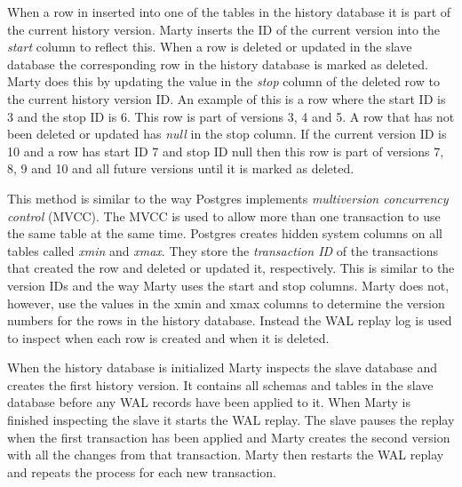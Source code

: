 When a row in inserted into one of the tables in the history database it is part of the current history version.
Marty inserts the ID of the current version into the \textit{start} column to reflect this.
When a row is deleted or updated in the slave database the corresponding row in the history database is marked as deleted.
Marty does this by updating the value in the \textit{stop} column of the deleted row to the current history version ID.
An example of this is a row where the start ID is 3 and the stop ID is 6.
This row is part of versions 3, 4 and 5.
A row that has not been deleted or updated has \textit{null} in the stop column.
If the current version ID is 10 and a row has start ID 7 and stop ID null then this row is part of versions 7, 8, 9 and 10 and all future versions until it is marked as deleted.

This method is similar to the way Postgres implements \textit{multiversion concurrency control} (MVCC).
The MVCC is used to allow more than one transaction to use the same table at the same time.
Postgres creates hidden system columns on all tables called \textit{xmin} and \textit{xmax}.
They store the \textit{transaction ID} of the transactions that created the row and deleted or updated it, respectively.
This is similar to the version IDs and the way Marty uses the start and stop columns.
Marty does not, however, use the values in the xmin and xmax columns to determine the version numbers for the rows in the history database.
Instead the WAL replay log is used to inspect when each row is created and when it is deleted.

When the history database is initialized Marty inspects the slave database and creates the first history version.
It contains all schemas and tables in the slave database before any WAL records have been applied to it.
When Marty is finished inspecting the slave it starts the WAL replay.
The slave pauses the replay when the first transaction has been applied and Marty creates the second version with all the changes from that transaction.
Marty then restarts the WAL replay and repeats the process for each new transaction.